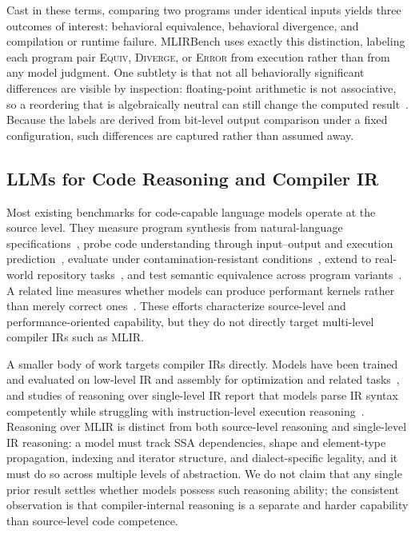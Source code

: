 \documentclass[sigplan,screen,review,anonymous]{acmart}
\begin{document}
Cast in these terms, comparing two programs under identical inputs yields three outcomes of interest: behavioral equivalence, behavioral divergence, and compilation or runtime failure. MLIRBench uses exactly this distinction, labeling each program pair \textsc{Equiv}, \textsc{Diverge}, or \textsc{Error} from execution rather than from any model judgment. One subtlety is that not all behaviorally significant differences are visible by inspection: floating-point arithmetic is not associative, so a reordering that is algebraically neutral can still change the computed result~\cite{goldberg1991floating}. Because the labels are derived from bit-level output comparison under a fixed configuration, such differences are captured rather than assumed away.

\subsection{LLMs for Code Reasoning and Compiler IR}

Most existing benchmarks for code-capable language models operate at the source level. They measure program synthesis from natural-language specifications~\cite{chen2021evaluating}, probe code understanding through input--output and execution prediction~\cite{gu2024cruxeval,liu2024codemind}, evaluate under contamination-resistant conditions~\cite{jain2025livecodebench}, extend to real-world repository tasks~\cite{roy2026codesense,jimenez2024swebench}, and test semantic equivalence across program variants~\cite{wei2025equibench}. A related line measures whether models can produce performant kernels rather than merely correct ones~\cite{ouyang2025kernelbench}. These efforts characterize source-level and performance-oriented capability, but they do not directly target multi-level compiler IRs such as MLIR.

A smaller body of work targets compiler IRs directly. Models have been trained and evaluated on low-level IR and assembly for optimization and related tasks~\cite{cummins2025llmcompiler}, and studies of reasoning over single-level IR report that models parse IR syntax competently while struggling with instruction-level execution reasoning~\cite{jiang2025iir}. Reasoning over MLIR is distinct from both source-level reasoning and single-level IR reasoning: a model must track SSA dependencies, shape and element-type propagation, indexing and iterator structure, and dialect-specific legality, and it must do so across multiple levels of abstraction. We do not claim that any single prior result settles whether models possess such reasoning ability; the consistent observation is that compiler-internal reasoning is a separate and harder capability than source-level code competence.
\end{document}
